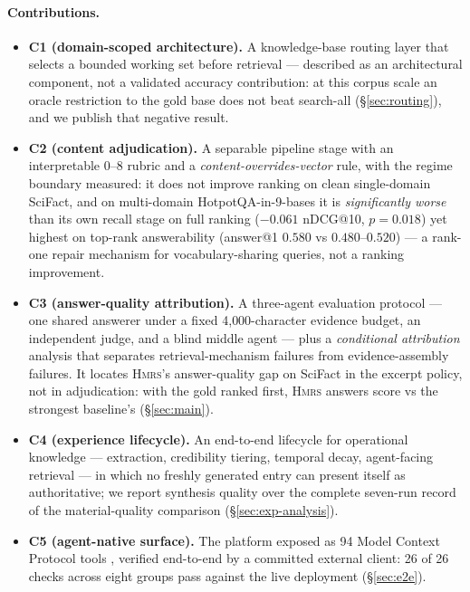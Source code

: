 \documentclass[sigconf, review, anonymous]{acmart}
\newcommand{\sys}{\textsc{Hmrs}}
\begin{document}
\paragraph{Contributions.}
\begin{itemize}
  \item \textbf{C1 (domain-scoped architecture).} A knowledge-base routing
  layer that selects a bounded working set before retrieval --- described as an
  architectural component, not a validated accuracy contribution: at this
  corpus scale an oracle restriction to the gold base does not beat search-all
  (\S\ref{sec:routing}), and we publish that negative result.
  \item \textbf{C2 (content adjudication).} A separable pipeline stage with an
  interpretable $0$--$8$ rubric and a \emph{content-overrides-vector} rule,
  with the regime boundary measured: it does not improve ranking on clean
  single-domain SciFact, and on multi-domain HotpotQA-in-9-bases it is
  \emph{significantly worse} than its own recall stage on full ranking
  ($-0.061$ nDCG@10, $p{=}0.018$) yet highest on top-rank answerability
  (answer@1 $0.580$ vs $0.480$--$0.520$) --- a rank-one repair mechanism for
  vocabulary-sharing queries, not a ranking improvement.
  \item \textbf{C3 (answer-quality attribution).} A three-agent evaluation
  protocol --- one shared answerer under a fixed 4{,}000-character evidence
  budget, an independent judge, and a blind middle agent --- plus a
  \emph{conditional attribution} analysis that separates retrieval-mechanism
  failures from evidence-assembly failures. It locates \sys{}'s answer-quality
  gap on SciFact in the excerpt policy, not in adjudication: with the gold
  ranked first, \sys{} answers score \hmrsJhit{} vs the strongest baseline's
  \denseJhit{} (\S\ref{sec:main}).
  \item \textbf{C4 (experience lifecycle).} An end-to-end lifecycle for
  operational knowledge --- extraction, credibility tiering, temporal decay,
  agent-facing retrieval --- in which no freshly generated entry can present
  itself as authoritative; we report synthesis quality over the complete
  seven-run record of the material-quality comparison
  (\S\ref{sec:exp-analysis}).
  \item \textbf{C5 (agent-native surface).} The platform exposed as 94 Model
  Context Protocol tools \cite{anthropic2024mcp}, verified end-to-end by a
  committed external client: 26 of 26 checks across eight groups pass
  against the live deployment (\S\ref{sec:e2e}).
\end{itemize}
\end{document}
